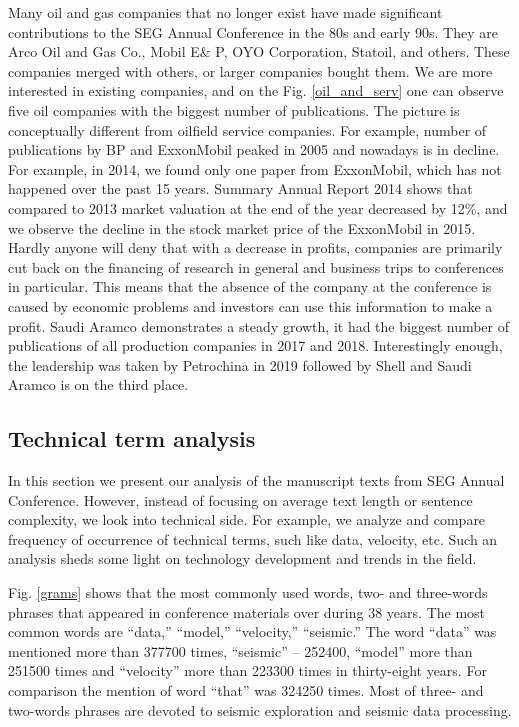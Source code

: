 \documentclass[geosciences,article,submit,moreauthors,pdftex]{Definitions/mdpi}
\begin{document}
Many oil and gas companies that no longer exist have made significant contributions to the SEG Annual Conference in the 80s and early 90s. They are Arco Oil and Gas Co., Mobil E\& P, OYO Corporation, Statoil, and others. These companies merged with others, or larger companies bought them. We are more interested in existing companies, and on the Fig. \ref{oil_and_serv} one can observe five oil companies with the biggest number of publications.  The picture is conceptually different from oilfield service companies. For example, number of publications by BP and ExxonMobil peaked in 2005 and nowadays is in decline.  For example, in 2014, we found only one paper from ExxonMobil, which has not happened over the past 15 years.  Summary Annual Report 2014 \citep{ExxonMobil2014} shows that compared to 2013 market valuation at the end of the year decreased by 12\%, and we observe the decline in the stock market price of the ExxonMobil in 2015. Hardly anyone will deny that with a decrease in profits, companies are primarily cut back on the financing of research in general and business trips to conferences in particular. This means that the absence of the company at the conference is caused by economic problems and investors can use this information to make a profit. Saudi Aramco demonstrates a steady growth, it had the biggest number of publications of all production companies in 2017 and 2018. Interestingly enough, the leadership was taken by Petrochina in 2019 followed by Shell and Saudi Aramco is on the third place.


\subsection{Technical term analysis}
In this section we present our analysis of the manuscript texts from SEG Annual Conference. However, instead of focusing on average text length or sentence complexity, we look into technical side. For example, we analyze and compare frequency of occurrence of technical terms, such like data, velocity, etc. Such an analysis sheds some light on technology development and trends in the field.

Fig. \ref{grams} shows that the most commonly used words, two- and three-words phrases that appeared in conference materials over during 38 years. The most common words are “data,” “model,” “velocity,” “seismic.” The word “data” was mentioned more than 377700 times, “seismic” – 252400, “model” more than 251500 times and “velocity” more than 223300 times in thirty-eight years. For comparison the mention of word “that” was 324250 times.  Most of three- and two-words phrases are devoted to seismic exploration and seismic data processing. 
\end{document}
